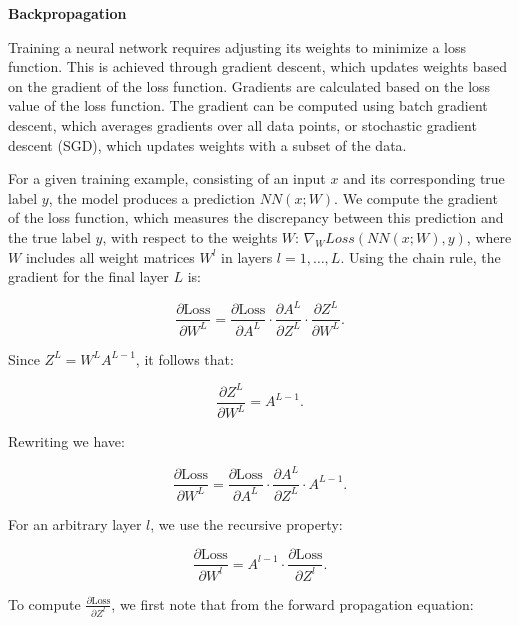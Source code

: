 \bigskip  

\textbf{Backpropagation}

Training a neural network requires adjusting its weights to minimize a loss function. This is achieved through gradient descent, which updates weights based on the gradient of the loss function. Gradients are calculated based on the loss value of the loss function. 
The gradient can be computed using batch gradient descent, which averages gradients over all data points, or stochastic gradient descent (SGD), which updates weights with a subset of the data.

For a given training example, consisting of an input $x$ and its corresponding true label $y$, the model produces a prediction $NN(x;W)$. We compute the gradient of the loss function, which measures the discrepancy between this prediction and the true label $y$, with respect to the weights $W$: $\nabla_{W}Loss(NN(x;W),y)$, where \( W \) includes all weight matrices \( W^l \) in layers \( l = 1, \dots, L \). Using the chain rule, the gradient for the final layer \( L \) is:

\begin{equation}
\frac{\partial \text{Loss}}{\partial W^L} = \frac{\partial \text{Loss}}{\partial A^L} \cdot \frac{\partial A^L}{\partial Z^L} \cdot \frac{\partial Z^L}{\partial W^L}.
\end{equation}

Since \( Z^L = W^L A^{L-1} \), it follows that:

\begin{equation}
\frac{\partial Z^L}{\partial W^L} = A^{L-1}.
\end{equation}

Rewriting we have:

\begin{equation}
\frac{\partial \text{Loss}}{\partial W^L} =
\frac{\partial \text{Loss}}{\partial A^L}
\cdot
 \frac{\partial A^L}{\partial Z^L} 
\cdot
A^{L-1}.
\end{equation}

For an arbitrary layer \( l \), we use the recursive property:

\begin{equation}
\frac{\partial \text{Loss}}{\partial W^l} =
A^{l-1} \cdot \frac{\partial \text{Loss}}{\partial Z^l}.
\end{equation}

To compute \( \frac{\partial \text{Loss}}{\partial Z^l} \), we first note that from the forward propagation equation:

